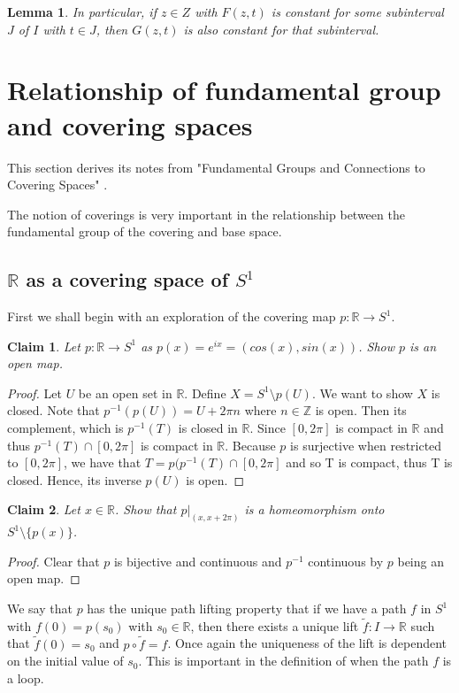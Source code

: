 \documentclass{article}
\newtheorem{lemma}[theorem]{Lemma}
\newtheorem{claim}{Claim}[section]
\theoremstyle{definition}
\newcommand{\RR}{\mathbb{R}}
\newcommand{\ZZ}{\mathbb{Z}}
\newcommand{\intersection}{\cap}
\begin{document}
\begin{lemma}
In particular, if $z \in Z$ with $F(z,t)$ is constant for some subinterval $J$ of $I$ with $t \in J$, then $G(z,t)$ is also constant for that subinterval.
\end{lemma}

\section{Relationship of fundamental group and covering spaces}
This section derives its notes from "Fundamental Groups and Connections to Covering Spaces" \cite{fundamental_groups_and_connections_to_covering_spaces}.

The notion of coverings is very important in the relationship between the fundamental group of the covering and base space.

\subsection{$\RR$ as a covering space of $S^1$}
First we shall begin with an exploration of the covering map $p: \RR \to S^1$. 
\begin{claim}
Let $p: \RR \to S^1$ as $p(x) = e^{ix} = (cos(x), sin(x))$. Show $p$ is an open map.
\end{claim}
\begin{proof}
Let $U$ be an open set in $\RR$. Define $X = S^{1} \setminus p(U)$. We want to show $X$ is closed. Note that $p^{-1}(p(U)) = U + 2 \pi n$ where $n \in \ZZ$ is open. Then its complement, which is $p^{-1}(T)$ is closed in $\RR$. Since $[0,2 \pi]$ is compact in $\RR$ and thus $p^{-1}(T) \intersection [0, 2 \pi]$ is compact in $\RR$. Because $p$ is surjective when restricted to $[0,2 \pi]$, we have that $T = p(p^{-1}(T) \intersection [0, 2 \pi]$ and so T is compact, thus T is closed. Hence, its inverse $p(U)$ is open.
\end{proof}
\pagebreak

\begin{claim}
Let $x \in \RR$. Show that $p|_{(x, x+2 \pi)}$ is a homeomorphism onto $S^{1} \setminus \{p(x)\}$.
\end{claim}
\begin{proof}
Clear that $p$ is bijective and continuous and $p^{-1}$ continuous by $p$ being an open map.
\end{proof}

We say that $p$ has the unique path lifting property that if we have a path $f$ in $S^1$ with $f(0) = p(s_0)$ with $s_0 \in \RR$, then there exists a unique lift $\tilde{f}: I \to \RR$ such that $\tilde{f}(0) = s_0$ and $p \circ \tilde{f} = f$. Once again the uniqueness of the lift is dependent on the initial value of $s_0$. This is important in the definition of when the path $f$ is a loop.
\end{document}
